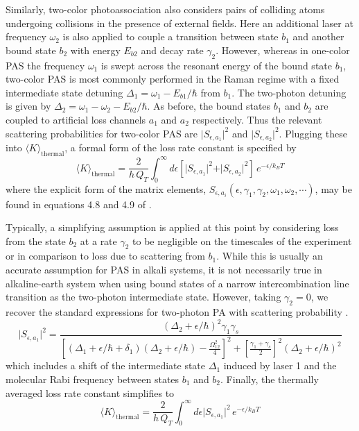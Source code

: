 Similarly, two-color photoassociation also considers pairs of colliding atoms undergoing collisions in the presence of external fields.
Here an additional laser at frequency $\omega_2$ is also applied to couple a transition between state $b_1$ and another bound state $b_2$ with energy $E_{b2}$ and decay rate $\gamma_2$.
However, whereas in one-color PAS the frequency $\omega_1$ is swept across the resonant energy of the bound state $b_1$, two-color PAS is most commonly performed in the Raman regime with a fixed intermediate state detuning $\Delta_1 = \omega_1 - E_{b1}/\hbar$ from $b_1$.
The two-photon detuning is given by $\Delta_2 = \omega_1 - \omega_2 - E_{b2}/\hbar$.
As before, the bound states $b_1$ and $b_2$ are coupled to artificial loss channels $a_1$ and $a_2$ respectively.
Thus the relevant scattering probabilities for two-color PAS are $\vert S_{\epsilon, a_1} \vert^2$ and $\vert S_{\epsilon, a_2} \vert^2$.
Plugging these into $\langle K \rangle_\text{thermal}$, a formal form of the loss rate constant is specified by
\begin{equation} \label{eq:kLoss2Ph}
  \langle K \rangle_\text{thermal} = \frac{2}{h\,Q_{T}} \int_{0}^{\infty} d\epsilon \left[ \vert S_{\epsilon, a_1} \vert^2 + \vert S_{\epsilon, a_2} \vert^2 \right] \,e^{-\epsilon/k_{B}T}
\end{equation}
where the explicit form of the matrix elements, $S_{\epsilon, a_i}(\epsilon,\gamma_1,\gamma_2,\omega_1,\omega_2,\cdots)$, may be found in equations 4.8 and 4.9 of \cite{Bohn1999}.

Typically, a simplifying assumption is applied at this point by considering loss from the state $b_2$ at a rate $\gamma_2$ to be negligible on the timescales of the experiment or in comparison to loss due to scattering from $b_1$.
While this is usually an accurate assumption for PAS in alkali systems, it is not necessarily true in alkaline-earth system when using bound states of a narrow intercombination line transition as the two-photon intermediate state.
However, taking $\gamma_2=0$, we recover the standard expressions for two-photon PA with scattering probability \cite{MartinezDeEscobar2008,Jones2006,Napolitano1994,Pachomov2017}.
\begin{equation} \label{eq:twoPhotonSe1}
	\vert  S_{\epsilon, a_1} \vert^2 = \frac{(\Delta_2 + \epsilon/\hbar)^2 \gamma_1 \gamma_s}{
  	\left[ (\Delta_1+\epsilon/\hbar+\delta_1) (\Delta_2+\epsilon/\hbar)-\frac{\Omega_{12}^{2}}{4}\right]^2 + \left[ \frac{\gamma_1 + \gamma_s}{2}\right]^2 (\Delta_2+\epsilon/\hbar)^2}
\end{equation}
which includes a shift of the intermediate state $\Delta_1$ induced by laser 1 and the molecular Rabi frequency between states $b_1$ and $b_2$.
Finally, the thermally averaged loss rate constant simplifies to
\begin{equation} \label{eq:twoPhotonKavg}
	\langle K \rangle_\text{thermal}  = \frac{2}{h\,Q_{T}} \int_{0}^{\infty} d\epsilon \vert  S_{\epsilon, a_1} \vert^2 \,e^{-\epsilon/k_{B}T}
\end{equation}



